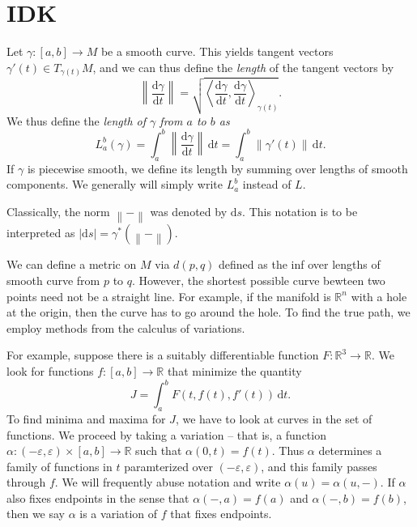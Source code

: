 \documentclass[11pt, letterpaper]{article}
\begin{document}
\section{IDK}

Let $\gamma : [a,b] \to M$ be a smooth curve. This yields tangent vectors $\gamma '(t)\in T_{\gamma (t)} M$, and we can thus define the \emph{length} of the tangent vectors by
\[
	\left\| \frac{\mathrm{d}\gamma }{\mathrm{d}t}  \right\| =\sqrt{\left\langle \frac{\mathrm{d}\gamma }{\mathrm{d}t} ,\frac{\mathrm{d}\gamma }{\mathrm{d}t}  \right\rangle_{\gamma (t)} } 
.\]
We thus define the \emph{length of $\gamma $ from $a$ to $b$ as}
\[
	L_a^b(\gamma )=\int_{a}^{b} \left\| \frac{\mathrm{d}\gamma }{\mathrm{d}t}  \right\|  \,\mathrm{d} t=\int_{a}^{b} \left\| \gamma '(t) \right\|  \,\mathrm{d} t
.\]
If $\gamma $ is piecewise smooth, we define its length by summing over lengths of smooth components. We generally will simply write $L_a^b$ instead of $L$.

Classically, the norm $\left\| - \right\| $ was denoted by $\mathrm{d} s$. This notation is to be interpreted as $\left| \mathrm{d} s \right| =\gamma ^*(\left\| - \right\| )$.

We can define a metric on $M$ via $d(p,q)$ defined as the inf over lengths of smooth curve from $p$ to $q$. However, the shortest possible curve bewteen two points need not be a straight line. For example, if the manifold is $\mathbb{R} ^n$ with a hole at the origin, then the curve has to go around the hole. To find the true path, we employ methods from the calculus of variations.


For example, suppose there is a suitably differentiable function $F : \mathbb{R} ^3 \to \mathbb{R} $. We look for functions $f : [a,b] \to \mathbb{R} $ that minimize the quantity
\[
	J=\int _a^b F(t,f(t),f'(t)) \,\mathrm{d} t
.\]
To find minima and maxima for $J$, we have to look at curves in the set of functions. We proceed by taking a variation -- that is, a function $\alpha : (-\varepsilon ,\varepsilon )\times [a,b] \to \mathbb{R} $ such that $\alpha (0,t)=f(t)$. Thus $\alpha $ determines a family of functions in $t$ paramterized over $(-\varepsilon ,\varepsilon )$, and this family passes through $f$. We will frequently abuse notation and write $\alpha (u)=\alpha (u,-)$. If $\alpha $ also fixes endpoints in the sense that $\alpha(-,a)=f(a)$ and $\alpha (-,b)=f(b)$, then we say $\alpha $ is a variation of $f$ that fixes endpoints.
\end{document}
